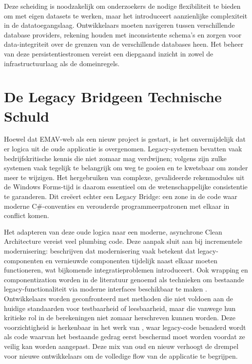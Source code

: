 Deze scheiding is noodzakelijk om onderzoekers de nodige flexibiliteit te bieden om met eigen datasets te werken, maar het introduceert aanzienlijke complexiteit in de datatoegangslaag. Ontwikkelaars moeten navigeren tussen verschillende database providers, rekening houden met inconsistente schema's en zorgen voor data-integriteit over de grenzen van de verschillende databases heen. Het beheer van deze persistentiestromen vereist een diepgaand inzicht in zowel de infrastructuurlaag als de domeinregels.

\section{De \textquotedbl Legacy Bridge\textquotedbl \@ en Technische Schuld}
Hoewel dat EMAV-web als een nieuw project is gestart, is het onvermijdelijk dat er logica uit de oude applicatie is overgenomen. Legacy-systemen bevatten vaak bedrijfskritische kennis die niet zomaar mag verdwijnen; volgens \textcite{comellaDorda2000survey} zijn zulke systemen vaak tegelijk te belangrijk om weg te gooien en te kwetsbaar om zonder meer te wijzigen. Het hergebruiken van complexe, gevalideerde rekenmodules uit de Windows Forms-tijd is daarom essentieel om de wetenschappelijke consistentie te garanderen. Dit creëert echter een Legacy Bridge: een zone in de code waar moderne C\#-conventies en verouderde programmeerpatronen met elkaar in conflict komen.

Het adapteren van deze oude logica naar een moderne, asynchrone Clean Architecture vereist veel plumbing code. Deze aanpak sluit aan bij incrementele modernisering: \textcite{seacord2001legacyModernization} beschrijven dat modernisering vaak betekent dat legacy-componenten en vernieuwde componenten tijdelijk naast elkaar moeten functioneren, wat bijkomende integratieproblemen introduceert. Ook wrapping en componentization worden in de literatuur genoemd als technieken om bestaande legacy-functionaliteit via moderne interfaces beschikbaar te maken \autocite{comellaDorda2000survey}. Ontwikkelaars worden geconfronteerd met methoden die niet voldoen aan de huidige standaarden voor testbaarheid of leesbaarheid, maar die vanwege hun kritieke rol in de berekeningen niet zomaar herschreven kunnen worden. Deze voorzichtigheid is herkenbaar in het werk van \textcite{feathers2004legacyCode}, waar legacy-code benaderd wordt als code waarvan het bestaande gedrag eerst beschermd moet worden voordat ze veilig kan worden aangepast. Deze mix van oud en nieuw verhoogt de drempel voor nieuwe ontwikkelaars om de volledige flow van de applicatie te begrijpen.

